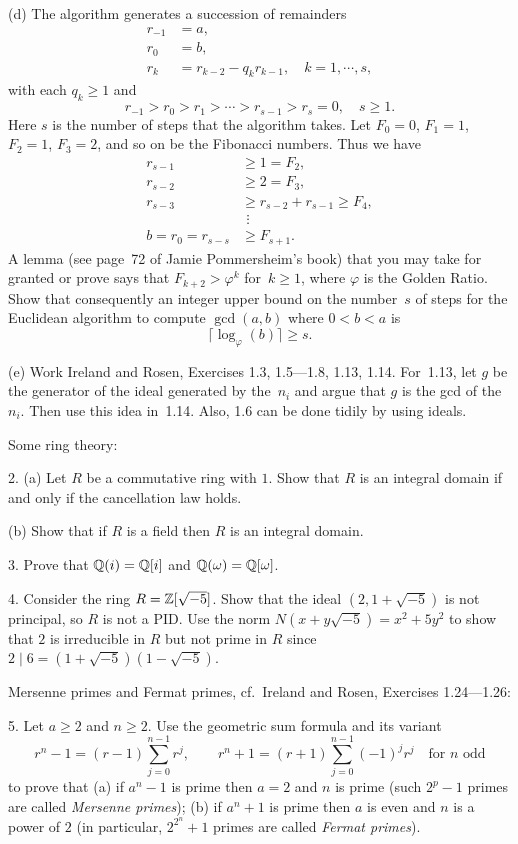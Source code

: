 \documentclass[12pt]{amsart}
\begin{document}
(d) The algorithm generates a succession of remainders
\begin{align*}
r_{-1}&=a,\\
r_0&=b,\\
r_k&=r_{k-2}-q_kr_{k-1},\quad k=1,\cdots,s,
\end{align*}
with each $q_k\ge1$ and
$$
r_{-1}>r_0>r_1>\cdots>r_{s-1}>r_s=0,\quad s\ge1.
$$
Here $s$ is the number of steps that the algorithm takes.
Let $F_0=0$, $F_1=1$, $F_2=1$, $F_3=2$, and so on be the Fibonacci numbers.
Thus we have
\begin{align*}
r_{s-1}&\ge1=F_2,\\
r_{s-2}&\ge2=F_3,\\
r_{s-3}&\ge r_{s-2}+r_{s-1}\ge F_4,\\
&\ \,\vdots\\
b=r_0=r_{s-s}&\ge F_{s+1}.
\end{align*}
A lemma (see page~72 of Jamie Pommersheim's book) that you may take
for granted or prove says that $F_{k+2}>\varphi^k$ for~$k\ge1$, where
$\varphi$ is the Golden Ratio.
Show that consequently an integer upper bound on the number~$s$ of
steps for the Euclidean algorithm to compute $\gcd(a,b)$ where
$0<b<a$ is
$$
\boxed{\lceil\log_\varphi(b)\rceil\ge s.}
$$

(e) Work Ireland and Rosen, Exercises 1.3, 1.5---1.8, 1.13, 1.14.
For~1.13, let $g$ be the generator of the ideal generated by the~$n_i$
and argue that $g$ is the gcd of the~$n_i$.  Then use this idea
in~1.14.  Also, 1.6 can be done tidily by using ideals.

\bigskip

Some ring theory:

2. (a) Let $R$ be a commutative ring with $1$.  Show that $R$ is an integral 
domain if and only if the cancellation law holds.

(b) Show that if $R$ is a field then $R$ is an integral domain.

3. Prove that ${\mathbb Q}(i)={\mathbb Q}[i]$ and ${\mathbb Q}(\omega)={\mathbb Q}[\omega]$.

4. Consider the ring $R={\mathbb Z}[\sqrt{-5}]$. 
Show that the ideal $(2, 1+\sqrt{-5})$ is not principal, so $R$ is not a PID.
Use the norm $N(x+y\sqrt{-5})=x^2+5y^2$ to show that $2$ is irreducible in $R$
but not prime in $R$ since $2\mid6=(1+\sqrt{-5})(1-\sqrt{-5})$.

\vfil\pagebreak

Mersenne primes and Fermat primes, cf.\ Ireland and Rosen, 
Exercises 1.24---1.26:

5.  Let $a\ge2$ and $n\ge2$.  Use the geometric sum formula and its variant
$$
r^n-1=(r-1)\sum_{j=0}^{n-1}r^j,
\qquad
r^n+1=(r+1)\sum_{j=0}^{n-1}(-1)^jr^j\quad\text{for $n$ odd}
$$
to prove that (a) if $a^n-1$ is prime then $a=2$ and $n$ is prime (such 
$2^p-1$ primes are called {\sl Mersenne primes}); (b) if $a^n+1$ is prime then
$a$ is even and $n$ is a power of $2$ (in particular, $2^{2^n}+1$ primes are 
called {\sl Fermat primes}).
\end{document}
